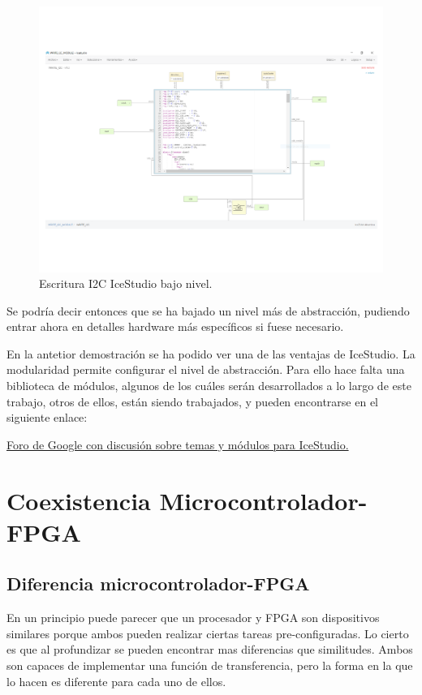 \begin{figure}[H]
	\center
	\includegraphics[trim = 0mm 0mm 0mm 0mm, clip,scale=0.4]{imagenes/EstadoArte/Write_i2c_module2.pdf}
	\caption{Escritura I2C IceStudio bajo nivel.}
	\label{fig:Write_i2c_module2}
\end{figure}

Se podría decir entonces que se ha bajado un nivel más de abstracción, pudiendo entrar ahora en detalles hardware más específicos si fuese necesario. \newline

En la antetior demostración se ha podido ver una de las ventajas de IceStudio. La modularidad permite configurar el nivel de abstracción.
Para ello hace falta una biblioteca de módulos, algunos de los cuáles serán desarrollados a lo largo de este trabajo, otros de ellos, están siendo trabajados, y pueden encontrarse en el siguiente enlace: 

\href{https://groups.google.com/forum/#!topic/fpga-wars-explorando-el-lado-libre/I3ZnqKlfh5M}{Foro de Google con discusión sobre temas y módulos para IceStudio.}


\section{Coexistencia Microcontrolador-FPGA}\label{sec:coexistencia}
\subsection{Diferencia microcontrolador-FPGA}
En un principio puede parecer que un procesador y FPGA son dispositivos similares porque ambos pueden realizar ciertas tareas pre-configuradas. Lo cierto es que al profundizar se pueden encontrar mas diferencias que similitudes. Ambos son capaces de implementar una función de transferencia, pero la forma en la que lo hacen es diferente para cada uno de ellos.\newline

